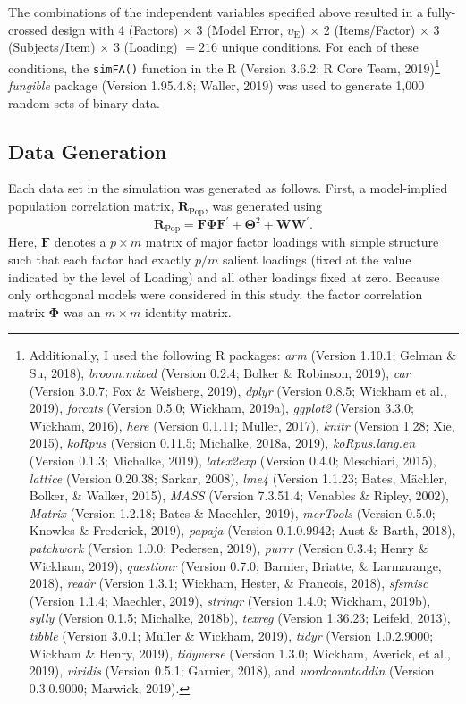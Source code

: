 \documentclass[
  english,
  man]{apa6}
\begin{document}
The combinations of the independent variables specified above resulted in a fully-crossed design with 4 (Factors) \(\times\) 3 (Model Error, \(\upsilon_{\textrm{E}}\)) \(\times\) 2 (Items/Factor) \(\times\) 3 (Subjects/Item) \(\times\) 3 (Loading) \(= 216\) unique conditions. For each of these conditions, the \texttt{simFA()} function in the R (Version 3.6.2; R Core Team, 2019)\footnote{Additionally, I used the following R packages: \emph{arm} (Version 1.10.1; Gelman \& Su, 2018), \emph{broom.mixed} (Version 0.2.4; Bolker \& Robinson, 2019), \emph{car} (Version 3.0.7; Fox \& Weisberg, 2019), \emph{dplyr} (Version 0.8.5; Wickham et al., 2019), \emph{forcats} (Version 0.5.0; Wickham, 2019a), \emph{ggplot2} (Version 3.3.0; Wickham, 2016), \emph{here} (Version 0.1.11; Müller, 2017), \emph{knitr} (Version 1.28; Xie, 2015), \emph{koRpus} (Version 0.11.5; Michalke, 2018a, 2019), \emph{koRpus.lang.en} (Version 0.1.3; Michalke, 2019), \emph{latex2exp} (Version 0.4.0; Meschiari, 2015), \emph{lattice} (Version 0.20.38; Sarkar, 2008), \emph{lme4} (Version 1.1.23; Bates, Mächler, Bolker, \& Walker, 2015), \emph{MASS} (Version 7.3.51.4; Venables \& Ripley, 2002), \emph{Matrix} (Version 1.2.18; Bates \& Maechler, 2019), \emph{merTools} (Version 0.5.0; Knowles \& Frederick, 2019), \emph{papaja} (Version 0.1.0.9942; Aust \& Barth, 2018), \emph{patchwork} (Version 1.0.0; Pedersen, 2019), \emph{purrr} (Version 0.3.4; Henry \& Wickham, 2019), \emph{questionr} (Version 0.7.0; Barnier, Briatte, \& Larmarange, 2018), \emph{readr} (Version 1.3.1; Wickham, Hester, \& Francois, 2018), \emph{sfsmisc} (Version 1.1.4; Maechler, 2019), \emph{stringr} (Version 1.4.0; Wickham, 2019b), \emph{sylly} (Version 0.1.5; Michalke, 2018b), \emph{texreg} (Version 1.36.23; Leifeld, 2013), \emph{tibble} (Version 3.0.1; Müller \& Wickham, 2019), \emph{tidyr} (Version 1.0.2.9000; Wickham \& Henry, 2019), \emph{tidyverse} (Version 1.3.0; Wickham, Averick, et al., 2019), \emph{viridis} (Version 0.5.1; Garnier, 2018), and \emph{wordcountaddin} (Version 0.3.0.9000; Marwick, 2019).} \emph{fungible} package (Version 1.95.4.8; Waller, 2019) was used to generate 1,000 random sets of binary data.

\hypertarget{data-generation}{%
\subsection{Data Generation}\label{data-generation}}

Each data set in the simulation was generated as follows. First, a model-implied population correlation matrix, \(\mathbf{R}_{\textrm{Pop}}\), was generated using
\begin{equation}
\mathbf{R}_{\textrm{Pop}}= \mathbf{F} \mathbf{\Phi} \mathbf{F}^{\prime} + \mathbf{\Theta}^2 + \mathbf{WW}^{\prime}.
\label{eq:sim-mod}
\end{equation}
Here, \(\mathbf{F}\) denotes a \(p \times m\) matrix of major factor loadings with simple structure such that each factor had exactly \(p/m\) salient loadings (fixed at the value indicated by the level of Loading) and all other loadings fixed at zero. Because only orthogonal models were considered in this study, the factor correlation matrix \(\mathbf{\Phi}\) was an \(m \times m\) identity matrix.
\end{document}
